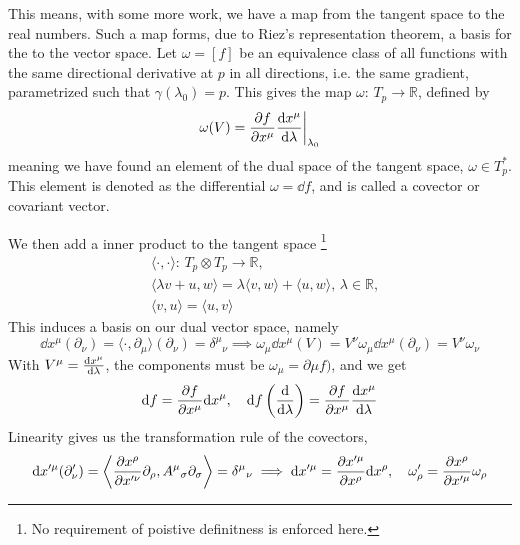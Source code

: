 This means, with some more work, we have a map from the tangent space to the real numbers.
Such a map forms, due to Riez's representation theorem, a basis for the to the vector space.
Let $\omega = [f]$ be an equivalence class of all functions with the same directional derivative at $p$ in all directions, i.e. the same gradient, parametrized such that $\gamma(\lambda_0) = p$. This gives the map $\omega: \, T_p \rightarrow \mathbb{R}$, defined by
\begin{equation*}
    \omega(V) = \pdv{f}{x^\mu} \odv{x^\mu}{\lambda} \bigg|_{\lambda_0}
\end{equation*}
meaning we have found an element of the dual space of the tangent space, $\omega \in T^*_p$. 
This element is denoted as the differential $\omega = \dd f$, and is called a covector or covariant vector. 

We then add a inner product to the tangent space \footnote{No requirement of poistive definitness is enforced here. }
\begin{align*}
    &\langle \cdot , \cdot \rangle: \, T_p \otimes T_p \longrightarrow \mathbb{R}, \\
    &\langle \lambda v + u , w \rangle = \lambda \langle v, w \rangle  + \langle u, w \rangle, \, \lambda \in \mathbb{R}, \\
    & \langle v,u \rangle = \langle u, v \rangle  
\end{align*}
This induces a basis on our dual vector space, namely
\begin{equation*}
    \dd x^\mu(\partial_\nu) = \langle \cdot, \partial_\mu \rangle(\partial_\nu) = \delta^\mu{}_\nu \implies  \omega_\mu \dd x^\mu(V) = V^\nu \omega_\mu \dd x^\mu(\partial_\nu) = V^\nu \omega_\nu
\end{equation*}
With $V^\mu = \odv{x^\mu}{\lambda}$, the components must be $\omega_\mu = \partial \mu f)$, and we get 
\begin{equation*}
    \dd f = \pdv{f}{x^\mu} \dd x^\mu, \quad \dd f\left(\odv{}{\lambda}\right) = \pdv{f}{x^\mu} \odv{x^\mu}{\lambda}
\end{equation*}
Linearity gives us the transformation rule of the covectors,
\begin{equation*}
    \dd x'^\mu(\partial'_\nu) =  \left\langle \pdv{x^\rho}{x'^\nu} \partial_\rho, A^\mu{}_{\sigma} \partial_\sigma \right\rangle = \delta^\mu{}_\nu \implies \dd x'^\mu = \pdv{x'^\mu}{x^\rho} \dd x^\rho, \quad \omega'_\rho = \pdv{x^\rho}{x'^\mu} \omega_\rho
\end{equation*}

